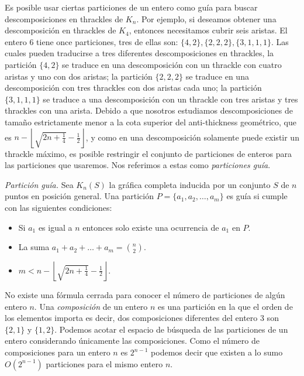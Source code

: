     Es posible usar ciertas particiones de un entero como guía para buscar
    descomposiciones en thrackles de $K_n$. Por ejemplo, si  deseamos obtener
    una descomposición en thrackles de $K_4$, entonces necesitamos cubrir
    seis aristas. El entero 6 tiene once particiones, tres de ellas son:
    $\{4,2\},\{2,2,2\},\{3,1,1,1\}$. Las cuales pueden traducirse a tres diferentes
    descomposiciones en thrackles, la partición $\{4,2\}$ se traduce en una descomposición
    con un thrackle con cuatro aristas y uno con dos aristas; la partición
    $\{2,2,2\}$ se traduce en una descomposición con tres thrackles con dos
    aristas cada uno; la partición $\{3,1,1,1\}$ se traduce a una descomposición
    con un thrackle con tres aristas y tres thrackles con una arista. Debido a que
    nosotros estudiamos descomposiciones de tamaño estrictamente menor
    a la cota superior del anti-thickness geométrico, que es
    $n - \left\lfloor\sqrt{2n+\frac{1}{4}} - \frac{1}{2}\right\rfloor$, y
    como en una descomposición solamente puede existir un thrackle máximo, es
    posible restringir el conjunto de particiones de enteros para
    las particiones que usaremos. Nos referimos a estas como
    \emph{particiones guía}.
    \begin{definition}{\emph{Partición guía.}} \label{definicion_particion_guia}
      Sea $K_n(S)$ la gráfica completa inducida por un conjunto $S$ de $n$
      puntos en posición general.
      Una partición $P=\{a_1,a_2,\dots,a_m\}$ es guía si cumple
      con las siguientes condiciones:
      \begin{itemize}
        \item Si $a_1$ es igual a $n$ entonces solo existe una ocurrencia de $a_1$ en $P$.
        \item La suma $a_1 + a_2 + \dots + a_m = \binom{n}{2}$.
        \item $m < n - \left\lfloor\sqrt{2n+\frac{1}{4}} - \frac{1}{2}\right\rfloor$.
      \end{itemize}
    \end{definition}

    No existe una fórmula cerrada para conocer el número de particiones de
    algún entero $n$. Una \emph{composición} de un entero $n$ es una partición
    en la que el orden de los elementos importa es decir, dos composiciones
    diferentes del entero 3 son $\{2,1\}$ y $\{1,2\}$. Podemos acotar el espacio de búsqueda de las
    particiones de un entero considerando únicamente las composiciones. Como el número de composiciones para un entero $n$ es $2^{n-1}$ podemos decir que existen a lo sumo $O(2^{n-1})$ particiones para el  mismo entero $n$.

